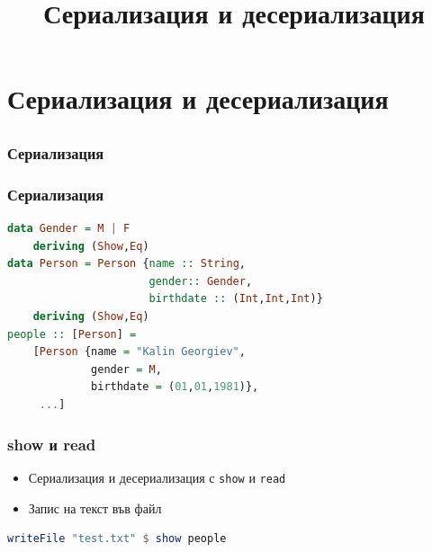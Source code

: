 \documentclass{beamer}
\begin{document}
\title[Сериализация и десериализация]{Сериализация и десериализация}
\frame{\titlepage}

\section{Сериализация и десериализация}
\subsection{}


\begin{frame}[fragile]
  \frametitle{Сериализация}
\end{frame}


\begin{frame}[fragile]
  \frametitle{Сериализация}

\begin{lstlisting}[basicstyle=\small,language=Haskell]
data Gender = M | F
    deriving (Show,Eq)
data Person = Person {name :: String, 
                      gender:: Gender, 
                      birthdate :: (Int,Int,Int)}
    deriving (Show,Eq)
people :: [Person] = 
    [Person {name = "Kalin Georgiev", 
             gender = M, 
             birthdate = (01,01,1981)},
     ...]
\end{lstlisting}

\end{frame}


\begin{frame}[fragile]
  \frametitle{show и read}

\begin{itemize}
  \item Сериализация и десериализация с \verb#show# и \verb#read#
  \item Запис на текст във файл
\end{itemize}

\bigskip

\begin{lstlisting}[basicstyle=\small,language=Haskell]
writeFile "test.txt" $ show people
\end{lstlisting}

\end{frame}
\end{document}
